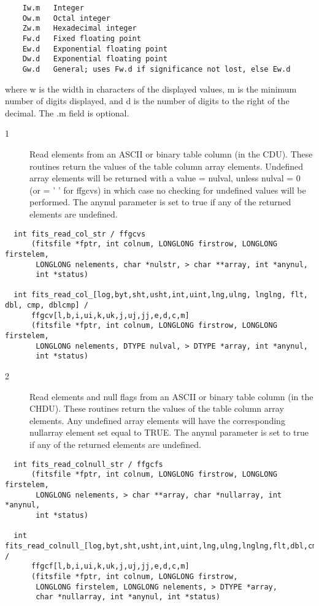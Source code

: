 \documentclass[11pt]{book}
\begin{document}
\begin{verbatim}
    Iw.m   Integer
    Ow.m   Octal integer
    Zw.m   Hexadecimal integer
    Fw.d   Fixed floating point
    Ew.d   Exponential floating point
    Dw.d   Exponential floating point
    Gw.d   General; uses Fw.d if significance not lost, else Ew.d
\end{verbatim}
    where w is the width in characters of the displayed values, m is
    the minimum number of digits displayed, and d is the number of
    digits to the right of the decimal.  The .m field is optional.


\begin{description}
\item[1 ] Read elements from an ASCII or binary table column (in the CDU).  These
    routines return the values of the table column array elements.  Undefined
    array elements will be returned with a value = nulval, unless nulval = 0
    (or = ' ' for ffgcvs) in which case no checking for undefined values will
    be performed. The anynul parameter is set to true if any of the returned
   elements are undefined. \label{ffgcvx}
\end{description}

\begin{verbatim}
  int fits_read_col_str / ffgcvs
      (fitsfile *fptr, int colnum, LONGLONG firstrow, LONGLONG firstelem,
       LONGLONG nelements, char *nulstr, > char **array, int *anynul,
       int *status)

  int fits_read_col_[log,byt,sht,usht,int,uint,lng,ulng, lnglng, flt, dbl, cmp, dblcmp] /
      ffgcv[l,b,i,ui,k,uk,j,uj,jj,e,d,c,m]
      (fitsfile *fptr, int colnum, LONGLONG firstrow, LONGLONG firstelem,
       LONGLONG nelements, DTYPE nulval, > DTYPE *array, int *anynul,
       int *status)
\end{verbatim}

\begin{description}
\item[2 ] Read elements and null flags from an ASCII or binary table column (in the
    CHDU).  These routines return the values of the table column array elements.
    Any undefined array elements will have the corresponding nullarray element
    set equal to TRUE.  The anynul parameter is set to true if any of the
   returned elements are undefined. \label{ffgcfx}
\end{description}

\begin{verbatim}
  int fits_read_colnull_str / ffgcfs
      (fitsfile *fptr, int colnum, LONGLONG firstrow, LONGLONG firstelem,
       LONGLONG nelements, > char **array, char *nullarray, int *anynul,
       int *status)

  int fits_read_colnull_[log,byt,sht,usht,int,uint,lng,ulng,lnglng,flt,dbl,cmp,dblcmp] /
      ffgcf[l,b,i,ui,k,uk,j,uj,jj,e,d,c,m]
      (fitsfile *fptr, int colnum, LONGLONG firstrow,
       LONGLONG firstelem, LONGLONG nelements, > DTYPE *array,
       char *nullarray, int *anynul, int *status)
\end{verbatim}
\end{document}
